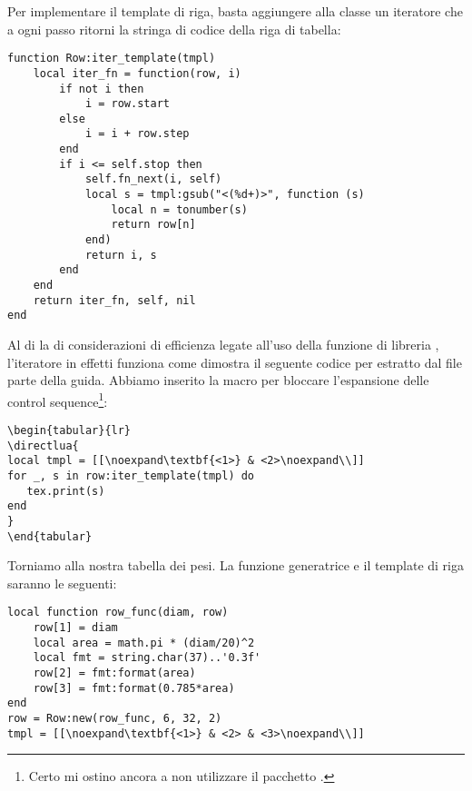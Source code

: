 Per implementare il template di riga, basta aggiungere alla classe  un
iteratore che a ogni passo ritorni la stringa di codice della riga di tabella:
%
%
%
%
%
\begin{Verbatim}
function Row:iter_template(tmpl)
    local iter_fn = function(row, i)
        if not i then
            i = row.start
        else
            i = i + row.step
        end
        if i <= self.stop then
            self.fn_next(i, self)
            local s = tmpl:gsub("<(%d+)>", function (s)
                local n = tonumber(s)
                return row[n]
            end)
            return i, s
        end
    end
    return iter_fn, self, nil
end
\end{Verbatim}

Al di la di considerazioni di efficienza legate all'uso della funzione di
libreria , l'iteratore in effetti funziona come dimostra il seguente
codice per \LuaLaTeX{} estratto dal file  parte
della guida. Abbiamo inserito la macro  per bloccare l'espansione
delle control sequence\footnote{Certo mi ostino ancora a non utilizzare il
pacchetto .}:
\begin{Verbatim}
\begin{tabular}{lr}
\directlua{
local tmpl = [[\noexpand\textbf{<1>} & <2>\noexpand\\]]
for _, s in row:iter_template(tmpl) do
   tex.print(s)
end
}
\end{tabular}
\end{Verbatim}

Torniamo alla nostra tabella dei pesi. La funzione generatrice e il template di
riga saranno le seguenti:
\begin{Verbatim}
local function row_func(diam, row)
    row[1] = diam
    local area = math.pi * (diam/20)^2
    local fmt = string.char(37)..'0.3f'
    row[2] = fmt:format(area)
    row[3] = fmt:format(0.785*area)
end
row = Row:new(row_func, 6, 32, 2)
tmpl = [[\noexpand\textbf{<1>} & <2> & <3>\noexpand\\]]
\end{Verbatim}


